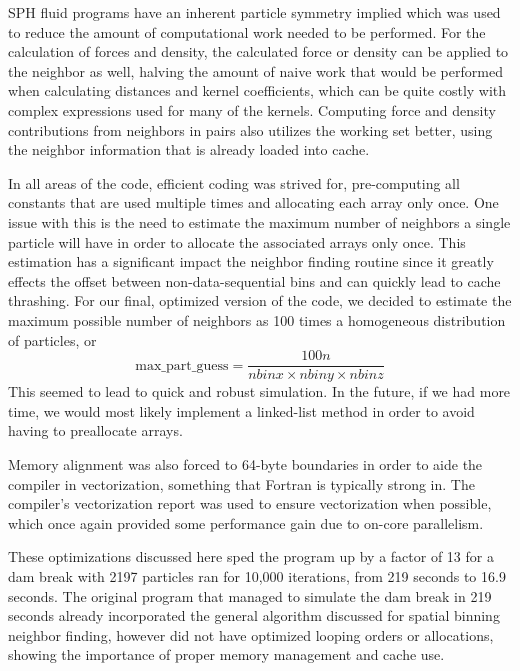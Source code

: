 \documentclass{scrartcl}
\begin{document}
	SPH fluid programs have an inherent particle symmetry implied which was used to reduce the amount of computational work needed to be performed. For the calculation of forces and density, the calculated force or density can be applied to the neighbor as well, halving the amount of naive work that would be performed when calculating distances and kernel coefficients, which can be quite costly with complex expressions used for many of the kernels. Computing force and density contributions from neighbors in pairs also utilizes the working set better, using the neighbor information that is already loaded into cache. 
	
	In all areas of the code, efficient coding was strived for, pre-computing all constants that are used multiple times and allocating each array only once. One issue with this is the need to estimate the maximum number of neighbors a single particle will have in order to allocate the associated arrays only once. This estimation has a significant impact the neighbor finding routine since it greatly effects the offset between non-data-sequential bins and can quickly lead to cache thrashing. For our final, optimized version of the code, we decided to estimate the maximum possible number of neighbors as 100 times a homogeneous distribution of particles, or
	\begin{equation}
	\mathrm{max\_part\_guess} = \frac{100 n}{nbinx \times nbiny \times nbinz}
	\end{equation}
	This seemed to lead to quick and robust simulation. In the future, if we had more time, we would most likely implement a linked-list method in order to avoid having to preallocate arrays.
	
	Memory alignment was also forced to 64-byte boundaries in order to aide the compiler in vectorization, something that Fortran is typically strong in. The compiler's vectorization report was used to ensure vectorization when possible, which once again provided some performance gain due to on-core parallelism.
	
	These optimizations discussed here sped the program up by a factor of 13 for a dam break with 2197 particles ran for 10,000 iterations, from 219 seconds to 16.9 seconds. The original program that managed to simulate the dam break in 219 seconds already incorporated the general algorithm discussed for spatial binning neighbor finding, however did not have optimized looping orders or allocations, showing the importance of proper memory management and cache use.
      
\end{document}
